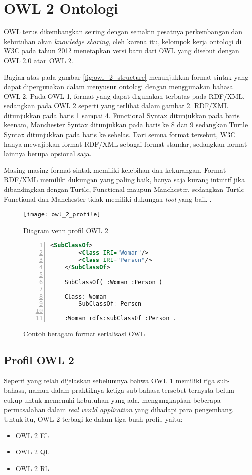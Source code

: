 \section{OWL 2 Ontologi}
OWL terus dikembangkan seiring dengan semakin pesatnya perkembangan dan kebutuhan akan \emph{knowledge sharing}, oleh karena itu, kelompok kerja ontologi di W3C pada tahun 2012 menetapkan versi baru dari OWL yang disebut dengan OWL 2.0 atau OWL 2.

Bagian atas pada gambar \ref{fig:owl_2_structure} menunjukkan format sintak yang dapat dipergunakan dalam menyusun ontologi dengan menggunakan bahasa OWL 2. Pada OWL 1, format yang dapat digunakan terbatas pada RDF/XML, sedangkan pada OWL 2 seperti yang terlihat dalam gambar \ref{fig:owl_serialization_formats}. RDF/XML ditunjukkan pada baris 1 sampai 4, Functional Syntax ditunjukkan pada baris keenam, Manchester Syntax ditunjukkan pada baris ke 8 dan 9 sedangkan Turtle Syntax ditunjukkan pada baris ke sebelas. Dari semua format tersebut, W3C hanya mewajibkan format RDF/XML sebagai format standar, sedangkan format lainnya berupa opsional saja.

Masing-masing format sintak memiliki kelebihan dan kekurangan. Format RDF/XML memiliki dukungan yang paling baik, hanya saja kurang intuitif jika dibandingkan dengan Turtle, Functional maupun Manchester, sedangkan Turtle Functional dan Manchester tidak memiliki dukungan \emph{tool} yang baik \citep{liyang_yu}.

\begin{figure}[ht]
	\centering
	\texttt{[image: owl\_2\_profile]}
	\caption{Diagram venn profil OWL 2}
	\label{fig:owl_2_profile}
\end{figure}

\begin{figure}[ht]
	\centering
	\begin{lstlisting}[language=XML, numbers=left]
	<SubClassOf>
		<Class IRI="Woman"/>
		<Class IRI="Person"/>
	</SubClassOf>

	SubClassOf( :Woman :Person )

	Class: Woman
		SubClassOf: Person

	:Woman rdfs:subClassOf :Person .\end{lstlisting}
	\caption{Contoh beragam format serialisasi OWL}
	\label{fig:owl_serialization_formats}
\end{figure}

\subsection{Profil OWL 2}
Seperti yang telah dijelaskan sebelumnya bahwa OWL 1 memiliki tiga sub-bahasa, namun dalam praktiknya ketiga sub-bahasa tersebut ternyata belum cukup untuk memenuhi kebutuhan yang ada. \citet{patel} mengungkapkan beberapa permasalahan dalam \emph{real world application} yang dihadapi para pengembang. Untuk itu, OWL 2 terbagi ke dalam tiga buah profil, yaitu:
\begin{itemize}
	\item OWL 2 EL
	\item OWL 2 QL
	\item OWL 2 RL
\end{itemize}

